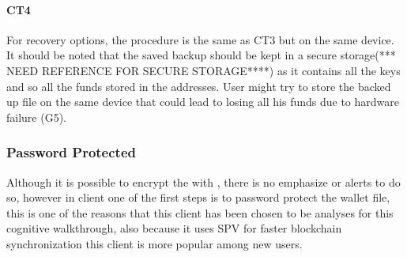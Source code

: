 \paragraph{CT4} For recovery options, the procedure is the same as CT3 but on the same device. It should be noted that the saved backup \walletfile should be kept in a secure storage(*** NEED REFERENCE FOR SECURE STORAGE****) as it contains all the keys and so all the funds stored in the addresses. User might try to store the backed up file on the same device that could lead to losing all his funds due to hardware failure (G5). %


\subsubsection{Password Protected}
Although it is possible to encrypt the \walletfile with \bitcoinclient, there is no emphasize or alerts to do so, however in \multibit client one of the first steps is to password protect the wallet file, this is one of the reasons that this client has been chosen to be analyses for this cognitive walkthrough, also because it uses SPV for faster blockchain synchronization this client is more popular among new users.

